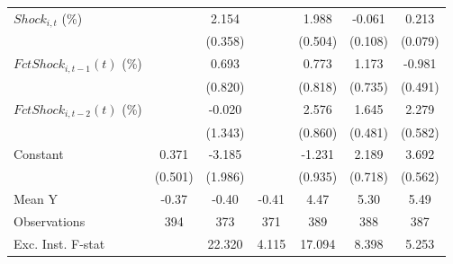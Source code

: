{\begin{tabular}{l*{6}{c}}
\addlinespace
$ Shock_{i,t}$ (\%) &                     &       2.154\sym{***}&                     &       1.988\sym{***}&      -0.061         &       0.213\sym{**} \\
                    &                     &     (0.358)         &                     &     (0.504)         &     (0.108)         &     (0.079)         \\
\addlinespace
$ FctShock_{i,t-1}(t)$ (\%)&                     &       0.693         &                     &       0.773         &       1.173         &      -0.981\sym{*}  \\
                    &                     &     (0.820)         &                     &     (0.818)         &     (0.735)         &     (0.491)         \\
\addlinespace
$ FctShock_{i,t-2}(t)$ (\%)&                     &      -0.020         &                     &       2.576\sym{***}&       1.645\sym{***}&       2.279\sym{***}\\
                    &                     &     (1.343)         &                     &     (0.860)         &     (0.481)         &     (0.582)         \\
\addlinespace
Constant            &       0.371         &      -3.185         &                     &      -1.231         &       2.189\sym{***}&       3.692\sym{***}\\
                    &     (0.501)         &     (1.986)         &                     &     (0.935)         &     (0.718)         &     (0.562)         \\
\midrule
Mean Y              &       -0.37         &       -0.40         &       -0.41         &        4.47         &        5.30         &        5.49         \\
Observations        &         394         &         373         &         371         &         389         &         388         &         387         \\
Exc. Inst. F-stat   &                     &      22.320         &       4.115         &      17.094         &       8.398         &       5.253         \\
\bottomrule
\end{tabular}
}
